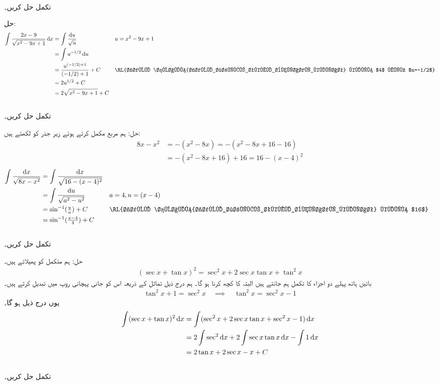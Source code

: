 \\
تکمل  حل کریں۔

حل:
\begin{align*}
\int\frac{2x-9}{\sqrt{x^2-9x+1}}\dif x&=\int\frac{\dif u}{\sqrt{u}}&&u=x^2-9x+1\\
&=\int u^{-1/2}\dif u\\
&=\frac{u^{(-1/2)+1}}{(-1/2)+1}+C&&\text{\RL{جدول \حوالہ{جدول_طریقے_تکمل_بنیادی_کلیات} کلیہ $4$ میں $n=-1/2$}}\\
&=2u^{1/2}+C\\
&=2\sqrt{x^2-9x+1}+C
\end{align*}
\\
تکمل  حل کریں۔

حل:\quad
ہم مربع مکمل کرتے ہوئے زیر جذر کو لکھتے ہیں:
\begin{align*}
8x-x^2&=-(x^2-8x)=-(x^2-8x+16-16)\\
&=-(x^2-8x+16)+16=16-(x-4)^2
\end{align*}
\begin{align*}
\int\frac{\dif x}{\sqrt{8x-x^2}}&=\int\frac{\dif x}{\sqrt{16-(x-4)^2}}\\
&=\int\frac{\dif u}{\sqrt{a^2-u^2}}&&a=4,u=(x-4)\\
&=\sin^{-1}(\tfrac{u}{a})+C&&\text{\RL{جدول \حوالہ{جدول_طریقے_تکمل_بنیادی_کلیات} کلیہ $16$}}\\
&=\sin^{-1}(\tfrac{x-4}{4})+C
\end{align*}
\\
تکمل  حل کریں۔

حل:\quad
ہم متکمل کو پھیلاتے ہیں۔
\begin{align*}
(\sec x+\tan x)^2=\sec^2x+2\sec x\tan x+\tan^2x
\end{align*}
بائیں ہاتھ پہلے دو اجزاء کا تکمل ہم جانتے ہیں البتہ  کا کچھ کرنا ہو گا۔ ہم درج ذیل تماثل کے ذریعہ اس کو جانی پہچانی روپ میں تبدیل کرتے ہیں۔
\begin{align*}
\tan^2x+1=\sec^2x\quad \implies\quad \tan^2x=\sec^2x-1
\end{align*}
یوں درج ذیل ہو گا۔
\begin{align*}
\int (\sec x+\tan x)^2\dif x&=\int(\sec^2x+2\sec x\tan x+\sec^2x-1)\dif x\\
&=2\int \sec^2\dif x+2\int\sec x\tan x\dif x-\int 1\dif x\\
&=2\tan x+2\sec x-x+C
\end{align*}
\\
تکمل  حل کریں۔

